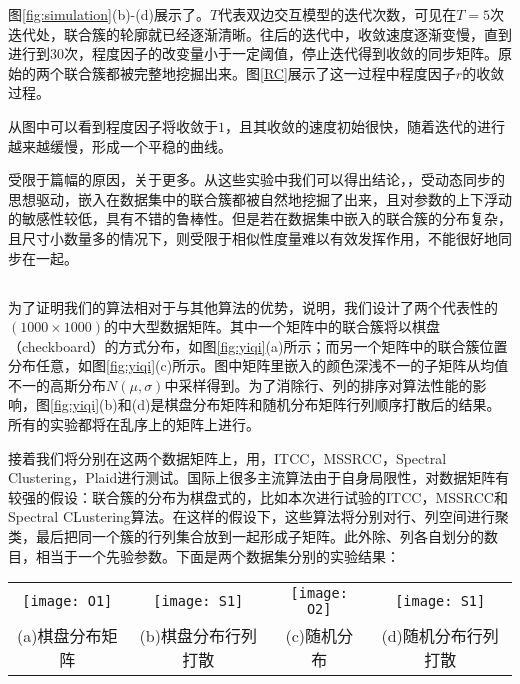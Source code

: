 \vspace{2mm}
图\ref{fig:simulation}(b)-(d)展示了。$T$代表双边交互模型的迭代次数，可见在$T=5$次迭代处，联合簇的轮廓就已经逐渐清晰。往后的迭代中，收敛速度逐渐变慢，直到进行到30次，程度因子的改变量小于一定阈值，停止迭代得到收敛的同步矩阵。原始的两个联合簇都被完整地挖掘出来。图\ref{RC}展示了这一过程中程度因子$r$的收敛过程。
\vspace{2mm}

从图中可以看到程度因子将收敛于$1$，且其收敛的速度初始很快，随着迭代的进行越来越缓慢，形成一个平稳的曲线。

受限于篇幅的原因，关于更多。从这些实验中我们可以得出结论，，受动态同步的思想驱动，嵌入在数据集中的联合簇都被自然地挖掘了出来，且对参数的上下浮动的敏感性较低，具有不错的鲁棒性。但是若在数据集中嵌入的联合簇的分布复杂，且尺寸小数量多的情况下，则受限于相似性度量难以有效发挥作用，不能很好地同步在一起。

\subsection{}
\label{subsec:compare}
为了证明我们的算法相对于与其他算法的优势，说明，我们设计了两个代表性的$(1000\times1000)$的中大型数据矩阵。其中一个矩阵中的联合簇将以棋盘（checkboard）的方式分布，如图\ref{fig:yiqi}(a)所示；而另一个矩阵中的联合簇位置分布任意，如图\ref{fig:yiqi}(c)所示。图中矩阵里嵌入的颜色深浅不一的子矩阵从均值不一的高斯分布$N(\mu,\sigma)$中采样得到。为了消除行、列的排序对算法性能的影响，图\ref{fig:yiqi}(b)和(d)是棋盘分布矩阵和随机分布矩阵行列顺序打散后的结果。所有的实验都将在乱序上的矩阵上进行。

接着我们将分别在这两个数据矩阵上，用\cosync，ITCC，MSSRCC，Spectral Clustering，Plaid进行测试。国际上很多主流算法由于自身局限性，对数据矩阵有较强的假设：联合簇的分布为棋盘式的，比如本次进行试验的ITCC，MSSRCC和Spectral CLustering算法。在这样的假设下，这些算法将分别对行、列空间进行聚类，最后把同一个簇的行列集合放到一起形成子矩阵。此外除、列各自划分的数目，相当于一个先验参数。下面是两个数据集分别的实验结果：

\vspace{4mm}
\tabcolsep=2pt
\begin{figure*}[!htb]
\centering
\begin{tabular}{cccc}
\texttt{[image: O1]}&
\texttt{[image: S1]}&
\texttt{[image: O2]}&
\texttt{[image: S1]}\\
(a)棋盘分布矩阵  & (b)棋盘分布行列打散 &(c)随机分布 &(d)随机分布行列打散
\end{tabular}
\caption{棋盘分布矩阵及行列顺序打散矩阵图}
\label{fig:yiqi}
\end{figure*}


